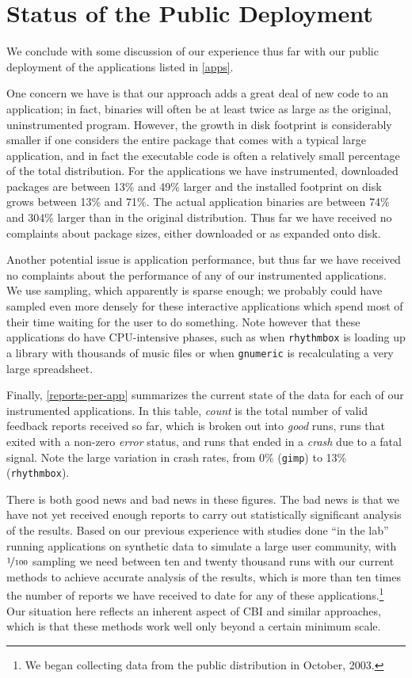 \documentclass[10pt,twocolumn]{article}
\newcommand{\gimp}{\texttt{gimp}\xspace}
\newcommand{\gnumeric}{\texttt{gnumeric}\xspace}
\newcommand{\rhythmbox}{\texttt{rhythmbox}\xspace}
\begin{document}
\section{Status of the Public Deployment}

We conclude with some discussion of our experience thus far with our public
deployment of the applications listed in \autoref{apps}.

One concern we have is that our approach adds a great deal of new code
to an application; in fact, binaries will often be at least twice as
large as the original, uninstrumented program.  However, the growth in
disk footprint is considerably smaller if one considers the entire
package that comes with a typical large application, and in fact the
executable code is often a relatively small percentage of the total
distribution.  For the applications we have instrumented, downloaded
packages are between 13\% and 49\% larger and the installed footprint
on disk grows between 13\% and 71\%.  The actual application binaries
are between 74\% and 304\% larger than in the original distribution.
Thus far we have received no complaints about package sizes, either
downloaded or as expanded onto disk.

Another potential issue is application performance, but thus far we
have received no complaints about the performance of any of our
instrumented applications.  We use  sampling, which
apparently is sparse enough; we probably could have sampled even more
densely for these interactive applications which spend most of their
time waiting for the user to do something.  Note however that 
these applications do have CPU-intensive phases, such as when
\rhythmbox is loading up a library with thousands of music files or
when \gnumeric is recalculating a very large spreadsheet.

Finally, \autoref{reports-per-app} summarizes the current state of
the data for each of our instrumented applications.  In this table,
\emph{count} is the total number of valid feedback reports received so far,
which is broken out into \emph{good} runs, runs that exited with a
non-zero \emph{error} status, and runs that ended in a \emph{crash} due to a
fatal signal.  Note the large variation in crash rates, from 0\%
(\gimp) to 13\% (\rhythmbox).

There is both good news and bad news in these figures.  The bad news
is that we have not yet received enough reports to carry out
statistically significant analysis of the results.  Based on our
previous experience with studies done ``in the lab'' running
applications on synthetic data to simulate a large user community,
with $\nicefrac{1}{100}$ sampling we need between ten and twenty thousand
runs with our current methods to achieve accurate analysis of
the results, which is more than ten times the number of reports we have
received to date for any of these applications.\footnote{We began
collecting data from the public distribution in October, 2003.}  Our
situation here reflects an inherent aspect of CBI and similar
approaches, which is that these methods work well only beyond a
certain minimum scale.
\end{document}
